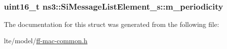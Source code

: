 \subsubsection[{\texorpdfstring{m\+\_\+periodicity}{m_periodicity}}]{\setlength{\rightskip}{0pt plus 5cm}uint16\+\_\+t ns3\+::\+Si\+Message\+List\+Element\+\_\+s\+::m\+\_\+periodicity}\hypertarget{structns3_1_1SiMessageListElement__s_afe1fa2e77d9f3400eeac85fc7f23c0f2}{}\label{structns3_1_1SiMessageListElement__s_afe1fa2e77d9f3400eeac85fc7f23c0f2}


The documentation for this struct was generated from the following file\+:\begin{DoxyCompactItemize}
\item 
lte/model/\hyperlink{ff-mac-common_8h}{ff-\/mac-\/common.\+h}\end{DoxyCompactItemize}
